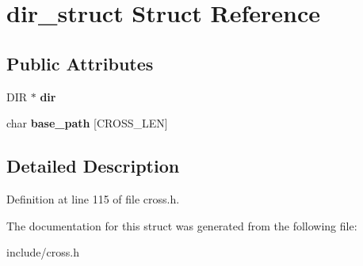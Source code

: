 \hypertarget{structdir__struct}{\section{dir\-\_\-struct Struct Reference}
\label{structdir__struct}
}
\subsection*{Public Attributes}
\begin{DoxyCompactItemize}
\item 
\hypertarget{structdir__struct_a972565488eed4eb755a2b2604e2fa9c5}{D\-I\-R $\ast$ {\bfseries dir}}\label{structdir__struct_a972565488eed4eb755a2b2604e2fa9c5}

\item 
\hypertarget{structdir__struct_a9cb3bc0a6f7312b318b93c25602ef196}{char {\bfseries base\-\_\-path} \mbox{[}C\-R\-O\-S\-S\-\_\-\-L\-E\-N\mbox{]}}\label{structdir__struct_a9cb3bc0a6f7312b318b93c25602ef196}

\end{DoxyCompactItemize}


\subsection{Detailed Description}


Definition at line 115 of file cross.\-h.



The documentation for this struct was generated from the following file\-:\begin{DoxyCompactItemize}
\item 
include/cross.\-h\end{DoxyCompactItemize}

